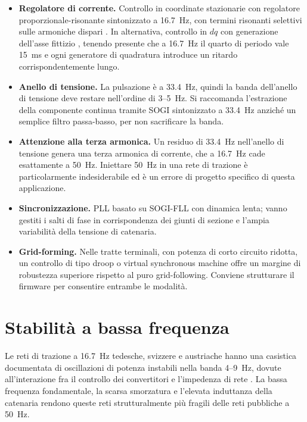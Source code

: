 \begin{itemize}
\item \textbf{Regolatore di corrente.} Controllo in coordinate stazionarie con regolatore
proporzionale-risonante sintonizzato a \SI{16.7}{\hertz}, con termini risonanti selettivi
sulle armoniche dispari \cite{zmood2003,teodorescu2011}. In alternativa, controllo in
$dq$ con generazione dell'asse fittizio \cite{bahrani2011}, tenendo presente che a
\SI{16.7}{\hertz} il quarto di periodo vale \SI{15}{\milli\second} e ogni generatore di
quadratura introduce un ritardo corrispondentemente lungo.

\item \textbf{Anello di tensione.} La pulsazione è a \SI{33.4}{\hertz}, quindi la banda
dell'anello di tensione deve restare nell'ordine di \SI{3}{}--\SI{5}{\hertz}. Si
raccomanda l'estrazione della componente continua tramite SOGI sintonizzato a
\SI{33.4}{\hertz} anziché un semplice filtro passa-basso, per non sacrificare la banda.

\item \textbf{Attenzione alla terza armonica.} Un residuo di \SI{33.4}{\hertz}
nell'anello di tensione genera una terza armonica di corrente, che a \SI{16.7}{\hertz}
cade esattamente a \SI{50}{\hertz}. Iniettare \SI{50}{\hertz} in una rete di trazione è
particolarmente indesiderabile ed è un errore di progetto specifico di questa
applicazione.

\item \textbf{Sincronizzazione.} PLL basato su SOGI-FLL con dinamica lenta; vanno
gestiti i salti di fase in corrispondenza dei giunti di sezione e l'ampia variabilità
della tensione di catenaria.

\item \textbf{Grid-forming.} Nelle tratte terminali, con potenza di corto circuito
ridotta, un controllo di tipo droop o virtual synchronous machine \cite{zhong2011} offre
un margine di robustezza superiore rispetto al puro grid-following. Conviene strutturare
il firmware per consentire entrambe le modalità.
\end{itemize}

\section{Stabilità a bassa frequenza}

Le reti di trazione a \SI{16.7}{\hertz} tedesche, svizzere e austriache hanno una
casistica documentata di oscillazioni di potenza instabili nella banda
\SI{4}{}--\SI{9}{\hertz}, dovute all'interazione fra il controllo dei convertitori e
l'impedenza di rete \cite{menth2006,danielsen2010}. La bassa frequenza fondamentale, la
scarsa smorzatura e l'elevata induttanza della catenaria rendono queste reti
strutturalmente più fragili delle reti pubbliche a \SI{50}{\hertz}.

